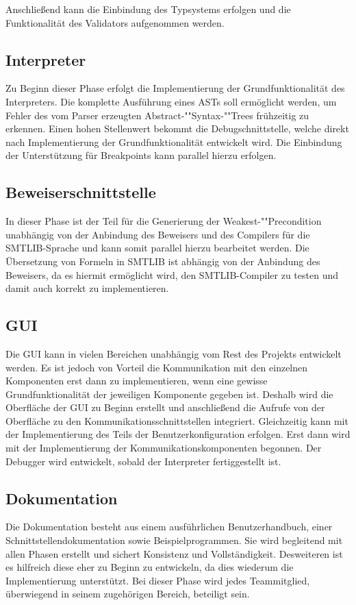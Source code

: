 
Anschließend kann die Einbindung des Typsystems erfolgen und die Funktionalität des Validators aufgenommen werden.

\subsection{Interpreter}
Zu Beginn dieser Phase erfolgt die Implementierung der Grundfunktionalität des Interpreters. Die komplette Ausführung eines ASTs soll ermöglicht werden, um Fehler des vom Parser erzeugten Abstract-""Syntax-""Trees frühzeitig zu erkennen. Einen hohen Stellenwert bekommt die Debugschnittstelle, welche direkt nach Implementierung der Grundfunktionalität entwickelt wird. Die Einbindung der Unterstützung für Breakpoints kann parallel hierzu erfolgen.

\subsection{Beweiserschnittstelle}
In dieser Phase ist der Teil für die Generierung der Weakest-""Precondition unabhängig von der Anbindung des Beweisers und des Compilers für die SMTLIB-Sprache und kann somit parallel hierzu bearbeitet werden. Die Übersetzung von Formeln in SMTLIB ist abhängig von der Anbindung des Beweisers, da es hiermit ermöglicht wird, den SMTLIB-Compiler zu testen und damit auch korrekt zu implementieren.

\subsection{GUI}
Die GUI kann in vielen Bereichen unabhängig vom Rest des Projekts entwickelt werden. Es ist jedoch von Vorteil die Kommunikation mit den einzelnen Komponenten erst dann zu implementieren, wenn eine gewisse Grundfunktionalität der jeweiligen Komponente gegeben ist. Deshalb wird die Oberfläche der GUI zu Beginn erstellt und anschließend die Aufrufe von der Oberfläche zu den Kommunikationsschnittstellen integriert. Gleichzeitig kann mit der Implementierung des Teils der Benutzerkonfiguration erfolgen. Erst dann wird mit der Implementierung der Kommunikationskomponenten begonnen. Der Debugger wird entwickelt, sobald der Interpreter fertiggestellt ist.

\subsection{Dokumentation}
Die Dokumentation besteht aus einem ausführlichen Benutzerhandbuch, einer Schnittstellendokumentation sowie Beispielprogrammen. Sie wird begleitend mit allen Phasen erstellt und sichert Konsistenz und Vollständigkeit. Desweiteren ist es hilfreich diese eher zu Beginn zu entwickeln, da dies wiederum die Implementierung unterstützt. Bei dieser Phase wird jedes Teammitglied, überwiegend in seinem zugehörigen Bereich, beteiligt sein.
